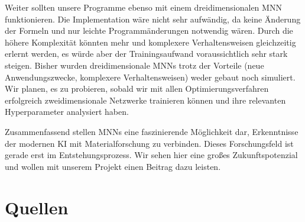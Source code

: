 \documentclass[10pt]{scrartcl}
\begin{document}
Weiter sollten unsere Programme ebenso mit einem dreidimensionalen MNN funktionieren.
Die Implementation wäre nicht sehr aufwändig, da keine Änderung der Formeln und nur leichte Programmänderungen notwendig wären.
Durch die höhere Komplexität könnten mehr und komplexere Verhaltensweisen gleichzeitig erlernt werden, es würde aber der Trainingsaufwand voraussichtlich sehr stark steigen.
Bisher wurden dreidimensionale MNNs trotz der Vorteile (neue Anwendungszwecke, komplexere Verhaltensweisen) weder gebaut noch simuliert.
Wir planen, es zu probieren, sobald wir mit allen Optimierungsverfahren erfolgreich zweidimensionale Netzwerke trainieren können und ihre relevanten Hyperparameter analysiert haben.

Zusammenfassend stellen MNNs eine faszinierende Möglichkeit dar, Erkenntnisse der modernen KI mit Materialforschung zu verbinden. Dieses Forschungsfeld ist gerade erst im Entstehungsprozess. Wir sehen hier eine großes Zukunftspotenzial und wollen mit unserem Projekt einen Beitrag dazu leisten.

\newpage

\section{Quellen}

\printbibliography[heading=none]
\end{document}
